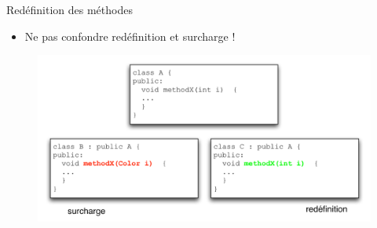 %
%
\begin{frame}{Redéfinition des méthodes}
\begin{itemize}
	\item Ne pas confondre redéfinition et surcharge !
\end{itemize}
\begin{figure}[htbp]
    \begin{center}
      \includegraphics[scale=.45]{fig/rideload.pdf}
    \end{center}
  \end{figure}
\end{frame}

